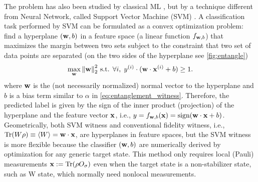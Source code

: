 \documentclass[
aps,
pra,
twocolumn,
floatfix,
]{revtex4-2}
\theoremstyle{plain}
\theoremstyle{definition}
\newcommand{\ew}{W}
\newcommand{\pob}{O}
\newcommand{\dm}{\rho}
\begin{document}
The  problem has also been studied by classical ML \cite{zhuMachineLearningDerivedEntanglement2021}  \cite{vintskevichClassificationFourqubitEntangled2022}, 
but by a technique different from Neural Network, called Support Vector Machine (SVM)  \cite{cortesSupportvectorNetworks1995}.
A classification task performed by SVM can be formulated as a convex optimization problem:
find a hyperplane $(\vb{w},b)$  in a feature space (a linear function $f_{\vb{w},b}$) that maximizes the margin between two sets subject to the constraint that two set of data points are separated (on the two sides of the hyperplane see \cref{fig:entangle})
\begin{equation}
	\max_{\vb{w}}
	\norm{\vb{w}}_2^2
	\text{ s.t. }
	\forall i,\; y^{(i)}\cdot (\vb{w}\cdot\vb{x}^{(i)}+b)\ge 1.
	\label{eq:svm_opt}
\end{equation}
where $\vb{w}$ is the (not necessarily normalized) normal vector to the hyperplane and $b$ is a bias term similar to $\alpha$ in \cref{eq:entanglement_witness}.
Therefore, the predicted label is given by the sign of the inner product (projection) of the hyperplane and the feature vector $\vb{x}$, i.e., $y=f_{\vb{w},b}(\vb{x})=\text{sign}(\vb{w}\cdot\vb{x}+b)$.
Geometrically, both SVM witness and conventional fidelity witness, i.e., $\Tr(W\dm)\equiv\expval{\ew}=\vbw \cdot \vbx$, are hyperplanes in feature spaces,
but the SVM witness is more flexible because the classifier $(\vb{w},b)$ are numerically derived by optimization for any generic target state.
This method only requires local (Pauli) measurements $\vbx:=\Tr(\dm\pob_{\sigma})$ even when the target state is a non-stabilizer state, such as W state, which normally need nonlocal measurements.
\end{document}

